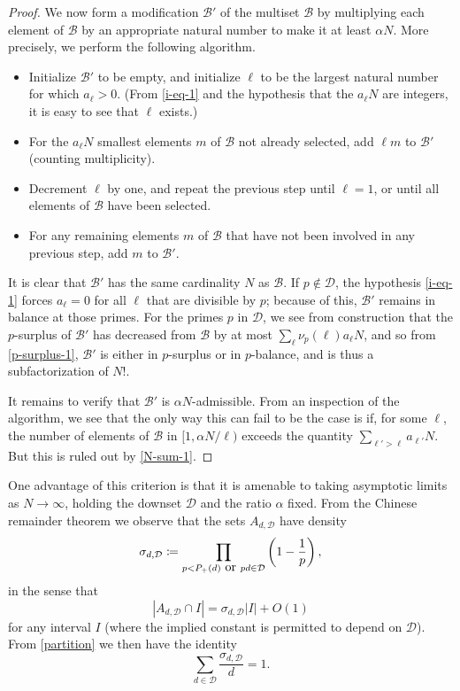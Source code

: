 \documentclass[12pt,a4paper,reqno]{amsart}
\numberwithin{equation}{section}
\theoremstyle{plain}
\theoremstyle{definition}
\newcommand\tuple{{\mathcal B}}
\begin{document}
\begin{proof}
  We now form a modification $\tuple'$ of the multiset $\tuple$ by multiplying each element of $\tuple$ by an appropriate natural number to make it at least $\alpha N$.  More precisely, we perform the following algorithm.
  \begin{itemize}
    \item Initialize $\tuple'$ to be empty, and initialize $\ell$ to be the largest natural number for which $a_\ell > 0$.  (From \eqref{i-eq-1} and the hypothesis that the $a_\ell N$ are integers, it is easy to see that $\ell$ exists.)
    \item For the $a_\ell N$ smallest elements $m$ of $\tuple$ not already selected, add $\ell m$ to $\tuple'$ (counting multiplicity).
    \item Decrement $\ell$ by one, and repeat the previous step until $\ell=1$, or until all elements of $\tuple$ have been selected.
    \item For any remaining elements $m$ of $\tuple$ that have not been involved in any previous step, add $m$ to $\tuple'$. 
  \end{itemize}
  It is clear that $\tuple'$ has the same cardinality $N$ as $\tuple$.  If $p \not \in {\mathcal D}$, the hypothesis \eqref{i-eq-1} forces $a_\ell=0$ for all $\ell$ that are divisible by $p$; because of this, $\tuple'$ remains in balance at those primes.  For the primes $p$ in ${\mathcal D}$, we see from construction that the $p$-surplus of $\tuple'$ has decreased from $\tuple$ by at most
  $\sum_\ell \nu_p(\ell) a_\ell N$, and so from \eqref{p-surplus-1}, $\tuple'$ is either in $p$-surplus or in $p$-balance, and is thus a subfactorization of $N!$.
  
It remains to verify that $\tuple'$ is $\alpha N$-admissible.  From an inspection of the algorithm, we see that the only way this can fail to be the case is if, for some $\ell$, the number of elements of $\tuple$ in $[1, \alpha N/\ell)$ exceeds the quantity $\sum_{\ell' > \ell} a_{\ell'} N$.  But this is ruled out by \eqref{N-sum-1}.
\end{proof}

One advantage of this criterion is that it is amenable to taking asymptotic limits as $N \to \infty$, holding the downset ${\mathcal D}$ and the ratio $\alpha$ fixed.  From the Chinese remainder theorem we observe that the sets $A_{d,{\mathcal D}}$ have density
$$ \sigma_{d,{\mathcal D}} \coloneqq \prod_{p < P_+(d) \hbox{ or } pd \in {\mathcal D}} \left(1-\frac{1}{p}\right),$$
in the sense that
\begin{equation}\label{crt}
 |A_{d,{\mathcal D}} \cap I| = \sigma_{d,{\mathcal D}} |I| + O(1)
\end{equation}
for any interval $I$ (where the implied constant is permitted to depend on ${\mathcal D}$).  From \eqref{partition} we then have the identity
\begin{equation}\label{sigma-id}
  \sum_{d \in {\mathcal D}} \frac{\sigma_{d,{\mathcal D}}}{d} = 1.
\end{equation}
\end{document}
